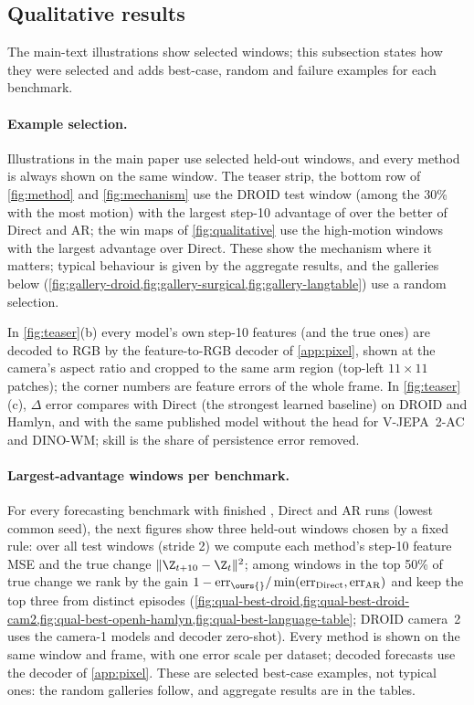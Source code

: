 \FloatBarrier
\subsection{Qualitative results}\label{app:qualitative}
The main-text illustrations show selected windows; this subsection states how they were selected and adds best-case,
random and failure examples for each benchmark.
\paragraph{Example selection.} Illustrations in the main paper use selected held-out windows, and every method is always shown
on the same window. The teaser strip, the bottom row of \cref{fig:method} and \cref{fig:mechanism} use the DROID test
window (among the 30\% with the most motion) with the largest step-10 advantage of \ours{} over the better of Direct and
AR; the win maps of \cref{fig:qualitative} use the high-motion windows with the largest advantage over Direct. These show
the mechanism where it matters; typical behaviour is given by the aggregate results, and the galleries below
(\cref{fig:gallery-droid,fig:gallery-surgical,fig:gallery-langtable}) use a random selection.

In \cref{fig:teaser}(b) every model's own step-10 features (and the true ones) are decoded to RGB by the
feature-to-RGB decoder of \cref{app:pixel}, shown at the camera's aspect ratio and cropped to the same arm region (top-left
$11{\times}11$ patches); the corner numbers are feature errors of the whole frame. In \cref{fig:teaser}(c), $\Delta$ error
compares \ours{} with Direct (the strongest learned baseline) on DROID and Hamlyn, and with the same published model without
the head for V-JEPA~2-AC and DINO-WM; skill is the share of persistence error removed.

\paragraph{Largest-advantage windows per benchmark.} For every forecasting benchmark with finished \ours{}, Direct and AR
runs (lowest common seed), the next figures show three held-out windows chosen by a fixed rule: over all test windows
(stride 2) we compute each method's step-10 feature MSE and the true change $\|\Z_{t+10}-\Z_t\|^2$; among windows in the
top 50\% of true change we rank by the gain $1-\mathrm{err}_{\text{\ours{}}}/\min(\mathrm{err}_{\text{Direct}},\mathrm{err}_{\text{AR}})$
and keep the top three from distinct episodes (\cref{fig:qual-best-droid,fig:qual-best-droid-cam2,fig:qual-best-openh-hamlyn,fig:qual-best-language-table}; DROID camera~2 uses the camera-1 models and decoder zero-shot). Every method is shown on the same window and frame, with one error scale
per dataset; decoded forecasts use the decoder of \cref{app:pixel}. These are selected best-case examples, not typical
ones: the random galleries follow, and aggregate results are in the tables.

